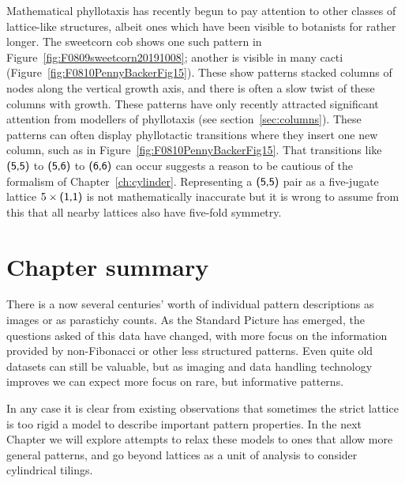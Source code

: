 Mathematical phyllotaxis has recently begun to pay attention to other classes of lattice-like structures, albeit ones which have been visible to botanists for rather longer.
  The  sweetcorn cob  shows one such pattern in Figure~\ref{fig:F0809sweetcorn20191008}; another is visible in many cacti (Figure~\ref{fig:F0810PennyBackerFig15}). These show patterns stacked columns of nodes along the vertical growth axis, and there is often a slow twist of these columns with growth. These patterns have only recently attracted significant attention from
  modellers of phyllotaxis (see section~\ref{sec:columns}). These patterns can often display phyllotactic transitions where they insert one new column, such as in Figure~\ref{fig:F0810PennyBackerFig15}.
  That transitions like  $\textsf{(5,5)}$ to $\textsf{(5,6)}$ to $\textsf{(6,6)}$ can occur suggests a reason to be cautious of  the formalism of Chapter~\ref{ch:cylinder}. Representing a $\textsf{(5,5)}$ pair as a five-jugate lattice $5\times\textsf{(1,1)}$ is not mathematically inaccurate but it is wrong to assume from this that all nearby lattices also have five-fold symmetry. 
  
  
  
  \section{Chapter summary}
  There is a now several centuries' worth of individual pattern descriptions as images or as parastichy counts. As the Standard Picture has emerged, the questions asked of this data have changed, with more focus on the information provided by non-Fibonacci or other less structured patterns. Even quite old datasets can still be valuable, but as imaging and data handling technology improves we can expect more focus on rare, but informative patterns. 
  
  In any case it is clear from existing observations that sometimes the strict lattice is too rigid a model to describe important pattern properties. In the next Chapter we will explore attempts to relax these models to ones that allow  more general patterns, and 
  go beyond lattices as a unit of analysis to consider cylindrical tilings. 

